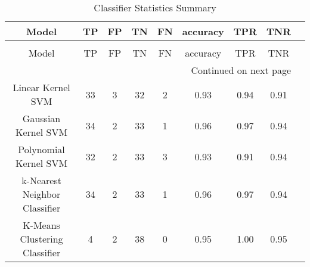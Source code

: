 \begin{longtable}[h!]{c|c|c|c|c|c|c|c|c}
\caption{Classifier Statistics Summary} \label{tab:summary table} \\
\toprule
Model & TP & FP & TN & FN & accuracy & TPR & TNR \\
\midrule
\endfirsthead
\caption[]{Classifier Statistics Summary} \\
\toprule
Model & TP & FP & TN & FN & accuracy & TPR & TNR \\
\midrule
\endhead
\midrule
\multicolumn{8}{r}{Continued on next page} \\
\midrule
\endfoot
\bottomrule
\endlastfoot
Linear Kernel SVM & 33 & 3 & 32 & 2 & 0.93 & 0.94 & 0.91 \\
Gaussian Kernel SVM & 34 & 2 & 33 & 1 & 0.96 & 0.97 & 0.94 \\
Polynomial Kernel SVM & 32 & 2 & 33 & 3 & 0.93 & 0.91 & 0.94 \\
k-Nearest Neighbor Classifier & 34 & 2 & 33 & 1 & 0.96 & 0.97 & 0.94 \\
K-Means Clustering Classifier & 4 & 2 & 38 & 0 & 0.95 & 1.00 & 0.95 \\
\end{longtable}
